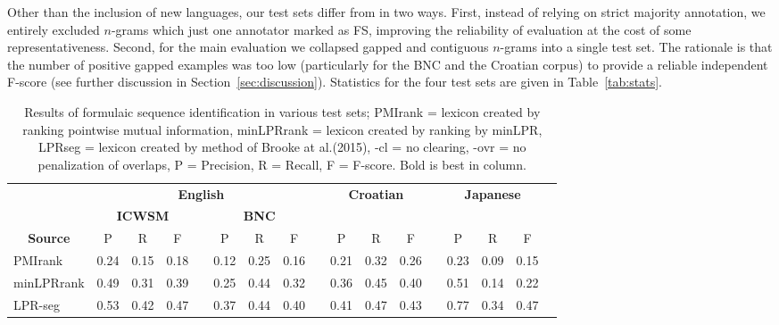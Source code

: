 \documentclass[11pt,letterpaper]{article}
\makeatletter
\def \al {al.\@ }
\newcommand{\tabref}[2][]{Table#1~\ref{#2}\xspace}
\newcommand{\secref}[2][]{Section#1~\ref{#2}\xspace}
\makeatother
\begin{document}
Other than the inclusion of new languages, our test sets differ from  in two ways. First, instead of relying on strict majority annotation, we entirely excluded $n$-grams which just one annotator marked as FS, improving the reliability of evaluation at the cost of some representativeness.  Second, for the main evaluation we collapsed gapped and contiguous $n$-grams into a single test set. The rationale is that the number of positive gapped examples was too low (particularly for the BNC and the Croatian corpus) to provide a reliable independent F-score (see further discussion in \secref{sec:discussion}). Statistics for the four test sets are given in \tabref{tab:stats}.



 \begin{table}[!bt]
 
 \begin{center}
  \caption{ Results of formulaic sequence identification in various test sets; PMIrank = lexicon created by ranking pointwise mutual information, minLPRrank = lexicon created by ranking by minLPR, LPRseg = lexicon created by method of Brooke at \al (2015), -cl = no clearing, -ovr = no penalization of overlaps, P = Precision, R = Recall, F = F-score. Bold is best in column.}
	 \label{tab:main}
 \begin{tabular}{lcccccccccccccccc}

       \hline
        \hline
				& \multicolumn{7}{c}{\bf{English}} & & \multicolumn{3}{c}{\bf{Croatian}} & & \multicolumn{3}{c}{\bf{Japanese}} \\
       \cline{2-9}			
       & \multicolumn{3}{c}{\bf{ICWSM}} & &  \multicolumn{3}{c}{\bf{BNC}} & & &&&  && & \\
       \cline{2-4} \cline{6-8} \cline{10-12} \cline{14-16}
           \multicolumn{1}{c}{\bf{Source}}    & P & R & F &   & P & R & F &   & P & R & F &  & P & R & F \\
            \hline
           \hline     
           
PMIrank & 0.24& 0.15& 0.18 & & 0.12 & 0.25 & 0.16 & & 0.21 &0.32 & 0.26 & & 0.23& 0.09 & 0.15 \\ 
minLPRrank & 0.49& 0.31 & 0.39 & & 0.25& 0.44 & 0.32 & & 0.36 & 0.45 & 0.40 &  & 0.51 & 0.14 & 0.22 \\ 

LPR-seg  &0.53 & 0.42 & 0.47 && 0.37 & 0.44 & 0.40 & & 0.41 & 0.47  & 0.43 &  & 0.77 & 0.34 & 0.47 \\ 
  \hline 


\end{tabular}
\end{center}
\end{table}
\end{document}
